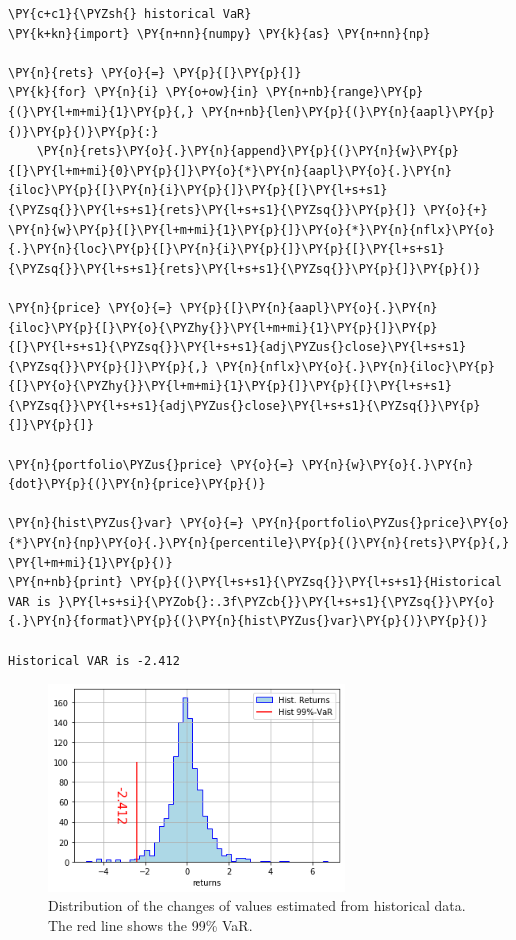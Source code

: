 \begin{tcolorbox}[breakable, size=fbox, boxrule=1pt, pad at break*=1mm,colback=cellbackground, colframe=cellborder]
\begin{Verbatim}[commandchars=\\\{\}]
\PY{c+c1}{\PYZsh{} historical VaR}
\PY{k+kn}{import} \PY{n+nn}{numpy} \PY{k}{as} \PY{n+nn}{np}
				
\PY{n}{rets} \PY{o}{=} \PY{p}{[}\PY{p}{]}
\PY{k}{for} \PY{n}{i} \PY{o+ow}{in} \PY{n+nb}{range}\PY{p}{(}\PY{l+m+mi}{1}\PY{p}{,} \PY{n+nb}{len}\PY{p}{(}\PY{n}{aapl}\PY{p}{)}\PY{p}{)}\PY{p}{:}
    \PY{n}{rets}\PY{o}{.}\PY{n}{append}\PY{p}{(}\PY{n}{w}\PY{p}{[}\PY{l+m+mi}{0}\PY{p}{]}\PY{o}{*}\PY{n}{aapl}\PY{o}{.}\PY{n}{iloc}\PY{p}{[}\PY{n}{i}\PY{p}{]}\PY{p}{[}\PY{l+s+s1}{\PYZsq{}}\PY{l+s+s1}{rets}\PY{l+s+s1}{\PYZsq{}}\PY{p}{]} \PY{o}{+} \PY{n}{w}\PY{p}{[}\PY{l+m+mi}{1}\PY{p}{]}\PY{o}{*}\PY{n}{nflx}\PY{o}{.}\PY{n}{loc}\PY{p}{[}\PY{n}{i}\PY{p}{]}\PY{p}{[}\PY{l+s+s1}{\PYZsq{}}\PY{l+s+s1}{rets}\PY{l+s+s1}{\PYZsq{}}\PY{p}{]}\PY{p}{)}
		
\PY{n}{price} \PY{o}{=} \PY{p}{[}\PY{n}{aapl}\PY{o}{.}\PY{n}{iloc}\PY{p}{[}\PY{o}{\PYZhy{}}\PY{l+m+mi}{1}\PY{p}{]}\PY{p}{[}\PY{l+s+s1}{\PYZsq{}}\PY{l+s+s1}{adj\PYZus{}close}\PY{l+s+s1}{\PYZsq{}}\PY{p}{]}\PY{p}{,} \PY{n}{nflx}\PY{o}{.}\PY{n}{iloc}\PY{p}{[}\PY{o}{\PYZhy{}}\PY{l+m+mi}{1}\PY{p}{]}\PY{p}{[}\PY{l+s+s1}{\PYZsq{}}\PY{l+s+s1}{adj\PYZus{}close}\PY{l+s+s1}{\PYZsq{}}\PY{p}{]}\PY{p}{]}
		
\PY{n}{portfolio\PYZus{}price} \PY{o}{=} \PY{n}{w}\PY{o}{.}\PY{n}{dot}\PY{p}{(}\PY{n}{price}\PY{p}{)}
		
\PY{n}{hist\PYZus{}var} \PY{o}{=} \PY{n}{portfolio\PYZus{}price}\PY{o}{*}\PY{n}{np}\PY{o}{.}\PY{n}{percentile}\PY{p}{(}\PY{n}{rets}\PY{p}{,} \PY{l+m+mi}{1}\PY{p}{)}
\PY{n+nb}{print} \PY{p}{(}\PY{l+s+s1}{\PYZsq{}}\PY{l+s+s1}{Historical VAR is }\PY{l+s+si}{\PYZob{}:.3f\PYZcb{}}\PY{l+s+s1}{\PYZsq{}}\PY{o}{.}\PY{n}{format}\PY{p}{(}\PY{n}{hist\PYZus{}var}\PY{p}{)}\PY{p}{)}

Historical VAR is -2.412
\end{Verbatim}
\end{tcolorbox}

\begin{figure}
	\centering
	\includegraphics[width=0.7\textwidth]{figures/Untitled_0_1.png}
	\caption{Distribution of the changes of values estimated from historical data. The red line shows the 99\% VaR.}
	\label{fig:hist_var}
\end{figure}

